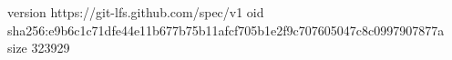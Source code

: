 version https://git-lfs.github.com/spec/v1
oid sha256:e9b6c1c71dfe44e11b677b75b11afcf705b1e2f9c707605047c8c0997907877a
size 323929
